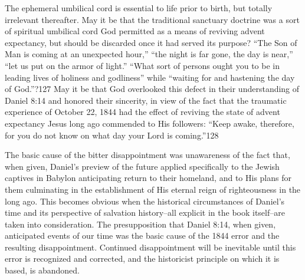 The ephemeral umbilical cord is essential to life prior to birth, but
totally irrelevant thereafter. May it be that the traditional sanctuary
doctrine was a sort of spiritual umbilical cord God permitted as a means of
reviving advent expectancy, but should be discarded once it had served its
purpose? ``The Son of Man is coming at an unexpected hour,'' ``the night is far
gone, the day is near,'' ``let us put on the armor of light.'' ``What sort of
persons ought you to be in leading lives of holiness and godliness'' while
``waiting for and hastening the day of God.''?127 May it be that God
overlooked this defect in their understanding of Daniel 8:14 and honored
their sincerity, in view of the fact that the traumatic experience of
October 22, 1844 had the effect of reviving the state of advent expectancy
Jesus long ago commended to His followers: ``Keep awake, therefore, for you
do not know on what day your Lord is coming.''128

The basic cause of the bitter disappointment was unawareness of the fact
that, when given, Daniel's preview of the future applied specifically to the
Jewish captives in Babylon anticipating return to their homeland, and to His
plans for them culminating in the establishment of His eternal reign of
righteousness in the long ago. This becomes obvious when the historical
circumstances of Daniel's time and its perspective of salvation
history--all explicit in the book itself--are taken into consideration.
The presupposition that Daniel 8:14, when given, anticipated events of our
time was the basic cause of the 1844 error and the resulting disappointment.
Continued disappointment will be inevitable until this error is recognized
and corrected, and the historicist principle on which it is based, is
abandoned.
